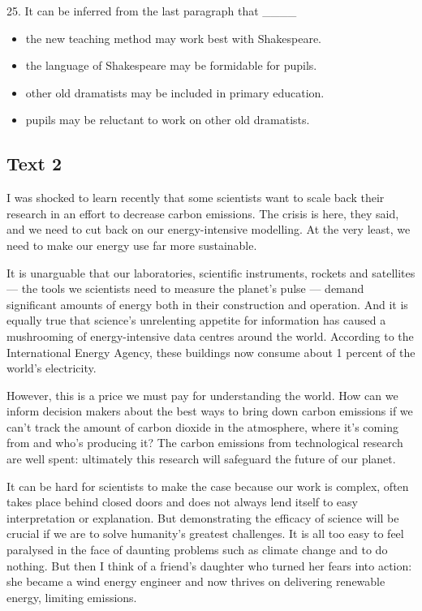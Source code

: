 \documentclass[UTF8,11pt]{ctexart}
\begin{document}
25. It can be inferred from the last paragraph that \_\_\_\_


\begin{itemize}[leftmargin=2em,itemsep=.2em,topsep=.4em]\item[A.] the new teaching method may work best with Shakespeare.
\item[B.] the language of Shakespeare may be formidable for pupils.
\item[C.] other old dramatists may be included in primary education.
\item[D.] pupils may be reluctant to work on other old dramatists.
\end{itemize}

\subsection*{\textbf{Text 2}}


I was shocked to learn recently that some scientists want to scale back their research in an effort to decrease carbon emissions. The crisis is here, they said, and we need to cut back on our energy-intensive modelling. At the very least, we need to make our energy use far more sustainable.


It is unarguable that our laboratories, scientific instruments, rockets and satellites — the tools we scientists need to measure the planet’s pulse — demand significant amounts of energy both in their construction and operation. And it is equally true that science’s unrelenting appetite for information has caused a mushrooming of energy-intensive data centres around the world. According to the International Energy Agency, these buildings now consume about 1 percent of the world’s electricity.


However, this is a price we must pay for understanding the world. How can we inform decision makers about the best ways to bring down carbon emissions if we can’t track the amount of carbon dioxide in the atmosphere, where it’s coming from and who’s producing it? The carbon emissions from technological research are well spent: ultimately this research will safeguard the future of our planet.


It can be hard for scientists to make the case because our work is complex, often takes place behind closed doors and does not always lend itself to easy interpretation or explanation. But demonstrating the efficacy of science will be crucial if we are to solve humanity’s greatest challenges. It is all too easy to feel paralysed in the face of daunting problems such as climate change and to do nothing. But then I think of a friend’s daughter who turned her fears into action: she became a wind energy engineer and now thrives on delivering renewable energy, limiting emissions.
\end{document}
